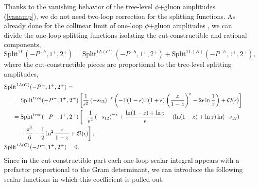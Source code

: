Thanks to the vanishing behavior of the tree-level $\phi$+gluon amplitudes (\ref{vanamp}), we do not need two-loop correction for the splitting functions. As already done for the collinear limit of one-loop $\phi$+gluon amplitudes \cite{Badger_2007}, we can divide the one-loop splitting functions isolating the cut-constructible and rational components, 
$$
	\text{Split}^{1L}(-P^{-h},1^+,2^+)=\text{Split}^{1L(C)}(-P^{-h},1^+,2^+)+\text{Split}^{1L(R)}(-P^{-h},1^+,2^+),
$$
where the cut-constructible pieces are proportional to the tree-level splitting amplitudes,
\begin{align*}
	&\text{Split}^{1L(C)}(-P^{-},1^+,2^+)=&\\
	&\hspace{0.5cm}=\text{Split}^{tree}(-P^{-},1^+,2^+)\left[\frac{1}{\epsilon^2}\left(-s_{12}\right)^{-\epsilon}\left(-\Gamma(1-\epsilon)\Gamma(1+\epsilon)\left(\frac{z}{1-z}\right)^\epsilon-2\epsilon \ln\frac{1}{z}\right)+\mathcal{O}(\epsilon)\right]&\\
	&\hspace{0.5cm}=\text{Split}^{tree}(-P^{-},1^+,2^+)\left[-\frac{1}{\epsilon^2}\left(-s_{12}\right)^{-\epsilon}+\frac{\ln(1-z)+\ln z}{\epsilon}-\left(\ln(1-z)+\ln z\right)\ln(-s_{12})\right.\\
	&\hspace{0.9cm}\left.-\frac{\pi^2}{6}-\frac{1}{2}\ln^2 \frac{z}{1-z}+\mathcal{O}(\epsilon)\right],&\\
	&\text{Split}^{1L(C)}(-P^{+},1^+,2^+)=0.&
\end{align*}
Since in the cut-constructible part each one-loop scalar integral appears with a prefactor proportional to the Gram determinant, we can introduce the following scalar functions in which this coefficient is pulled out.
